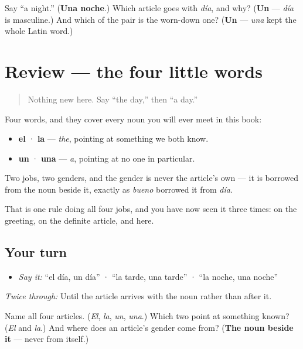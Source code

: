\begin{tcolorbox}[breakable,colback=teal!4,colframe=teal!35!black,title={Before you move on}]
Say \textquotedblleft{}a night.\textquotedblright{} (\textbf{Una noche}.) Which article goes with \emph{día}, and why? (\textbf{Un} — \emph{día} is masculine.) And which of the pair is the worn-down one? (\textbf{Un} — \emph{una} kept the whole Latin word.)
\end{tcolorbox}
\section[Practice]{Review — the four little words}

\label{lesson:ES-C02-repaso-articulos}



\begin{quote}
Nothing new here. Say \textquotedblleft{}the day,\textquotedblright{} then \textquotedblleft{}a day.\textquotedblright{}
\end{quote}

\begin{grammarlens}[title={What you've built}]
Four words, and they cover every noun you will ever meet in this book:

\begin{itemize}
\raggedright
  \item \textbf{el} · \textbf{la} — \emph{the}, pointing at something we both know.
  \item \textbf{un} · \textbf{una} — \emph{a}, pointing at no one in particular.
\end{itemize}

Two jobs, two genders, and the gender is never the article's own — it is borrowed from the noun beside it, exactly as \emph{bueno} borrowed it from \emph{día}.

That is one rule doing all four jobs, and you have now seen it three times: on the greeting, on the definite article, and here.
\end{grammarlens}

\subsection*{Your turn}
\begin{itemize}
\raggedright
  \item \emph{Say it:} \textquotedblleft{}el día, un día\textquotedblright{} · \textquotedblleft{}la tarde, una tarde\textquotedblright{} · \textquotedblleft{}la noche, una noche\textquotedblright{}
\end{itemize}

\emph{Twice through:} Until the article arrives with the noun rather than after it.

\begin{tcolorbox}[breakable,colback=teal!4,colframe=teal!35!black,title={Before you move on}]
Name all four articles. (\emph{El}, \emph{la}, \emph{un}, \emph{una}.) Which two point at something known? (\emph{El} and \emph{la}.) And where does an article's gender come from? (\textbf{The noun beside it} — never from itself.)
\end{tcolorbox}
